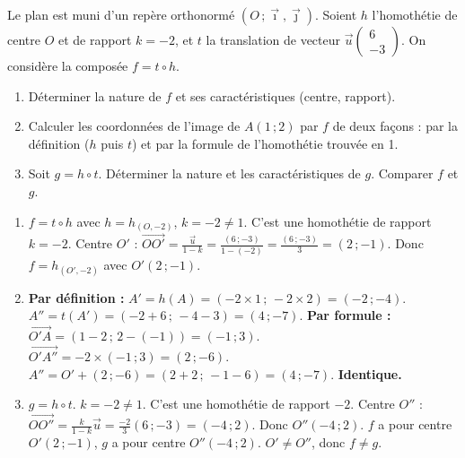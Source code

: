 \documentclass[11pt]{article}
\begin{document}
\begin{exercice}
Le plan est muni d'un repère orthonormé $(O\,;\vec{\imath},\vec{\jmath})$.
Soient $h$ l'homothétie de centre $O$ et de rapport $k = -2$, et $t$ la translation de vecteur $\vec{u}\begin{pmatrix} 6 \\ -3 \end{pmatrix}$.
On considère la composée $f = t \circ h$.
\begin{enumerate}
\item Déterminer la nature de $f$ et ses caractéristiques (centre, rapport).
\item Calculer les coordonnées de l'image de $A(1\,;2)$ par $f$ de deux façons : par la définition ($h$ puis $t$) et par la formule de l'homothétie trouvée en 1.
\item Soit $g = h \circ t$. Déterminer la nature et les caractéristiques de $g$. Comparer $f$ et $g$.
\end{enumerate}
\end{exercice}

\begin{corrige}[Exercice]
\begin{enumerate}
\item $f = t \circ h$ avec $h = h_{(O,-2)}$, $k=-2 \neq 1$. C'est une homothétie de rapport $k=-2$.
Centre $O'$ : $\overrightarrow{OO'} = \frac{\vec{u}}{1-k} = \frac{(6\,;-3)}{1-(-2)} = \frac{(6\,;-3)}{3} = (2\,;-1)$.
Donc $f = h_{(O',-2)}$ avec $O'(2\,;-1)$.
\item \textbf{Par définition :} $A' = h(A) = (-2 \times 1\,;\, -2 \times 2) = (-2\,;-4)$.
$A'' = t(A') = (-2+6\,;\,-4-3) = (4\,;-7)$.
\textbf{Par formule :} $\overrightarrow{O'A} = (1-2\,;\,2-(-1)) = (-1\,;3)$.
$\overrightarrow{O'A''} = -2 \times (-1\,;3) = (2\,;-6)$.
$A'' = O' + (2\,;-6) = (2+2\,;\,-1-6) = (4\,;-7)$. \textbf{Identique.}
\item $g = h \circ t$. $k=-2 \neq 1$. C'est une homothétie de rapport $-2$.
Centre $O''$ : $\overrightarrow{OO''} = \frac{k}{1-k}\vec{u} = \frac{-2}{3}(6\,;-3) = (-4\,;2)$.
Donc $O''(-4\,;2)$.
$f$ a pour centre $O'(2\,;-1)$, $g$ a pour centre $O''(-4\,;2)$. $O' \neq O''$, donc $f \neq g$.
\end{enumerate}
\end{corrige}
\end{document}
